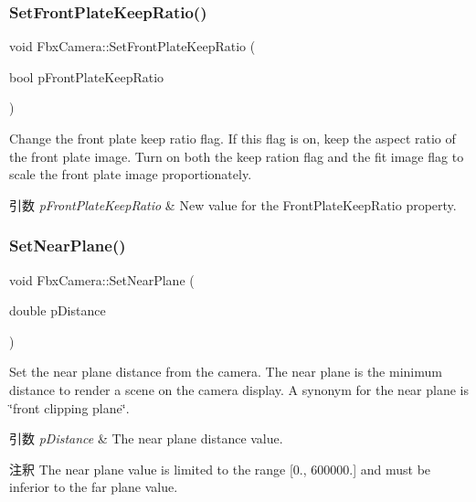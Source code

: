 \subsubsection{\texorpdfstring{Set\+Front\+Plate\+Keep\+Ratio()}{SetFrontPlateKeepRatio()}}
{\footnotesize\ttfamily void Fbx\+Camera\+::\+Set\+Front\+Plate\+Keep\+Ratio (\begin{DoxyParamCaption}\item[{bool}]{p\+Front\+Plate\+Keep\+Ratio }\end{DoxyParamCaption})}

Change the front plate keep ratio flag. If this flag is on, keep the aspect ratio of the front plate image. Turn on both the keep ration flag and the fit image flag to scale the front plate image proportionately. 
\begin{DoxyParams}{引数}
{\em p\+Front\+Plate\+Keep\+Ratio} & New value for the Front\+Plate\+Keep\+Ratio property. \\
\hline
\end{DoxyParams}
\mbox{\label{class_fbx_camera_a4ceb2775d2392c380cd8529d78f98c7f}} 
\subsubsection{\texorpdfstring{Set\+Near\+Plane()}{SetNearPlane()}}
{\footnotesize\ttfamily void Fbx\+Camera\+::\+Set\+Near\+Plane (\begin{DoxyParamCaption}\item[{double}]{p\+Distance }\end{DoxyParamCaption})}

Set the near plane distance from the camera. The near plane is the minimum distance to render a scene on the camera display. A synonym for the near plane is \char`\"{}front clipping plane\char`\"{}. 
\begin{DoxyParams}{引数}
{\em p\+Distance} & The near plane distance value. \\
\hline
\end{DoxyParams}
\begin{DoxyRemark}{注釈}
The near plane value is limited to the range \mbox{[}0., 600000.\mbox{]} and must be inferior to the far plane value. 
\end{DoxyRemark}
\mbox{\label{class_fbx_camera_a55058f98c5bdaed70ad02c9062804798}} 
